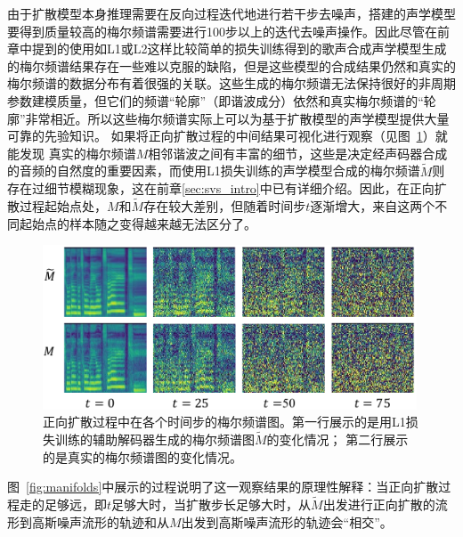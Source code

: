 由于扩散模型本身推理需要在反向过程迭代地进行若干步去噪声，搭建的声学模型要得到质量较高的梅尔频谱需要进行100步以上的迭代去噪声操作。因此尽管在前章中提到的使用如L1或L2这样比较简单的损失训练得到的歌声合成声学模型生成的梅尔频谱结果存在一些难以克服的缺陷，但是这些模型的合成结果仍然和真实的梅尔频谱的数据分布有着很强的关联。这些生成的梅尔频谱无法保持很好的非周期参数建模质量，但它们的频谱``轮廓''（即谐波成分）依然和真实梅尔频谱的``轮廓''非常相近。所以这些梅尔频谱实际上可以为基于扩散模型的声学模型提供大量可靠的先验知识。
如果将正向扩散过程的中间结果可视化进行观察（见图~\ref{fig:fake_real_mels_diffusion}）就能发现
真实的梅尔频谱$M$相邻谐波之间有丰富的细节，这些是决定经声码器合成的音频的自然度的重要因素，而使用L1损失训练的声学模型合成的梅尔频谱$\widetilde{M}$则存在过细节模糊现象，这在前章\ref{sec:svs_intro}中已有详细介绍。因此，在正向扩散过程起始点处，$M$和$\widetilde{M}$存在较大差别，但随着时间步$t$逐渐增大，来自这两个不同起始点的样本随之变得越来越无法区分了。
\begin{figure}[!h]
    \centering
    \includegraphics[width=0.99\textwidth,]{figure/svs/fake_real_mel.pdf}
    \caption{正向扩散过程中在各个时间步的梅尔频谱图。第一行展示的是用L1损失训练的辅助解码器生成的梅尔频谱图$\widetilde{M}$的变化情况； 第二行展示的是真实的梅尔频谱图的变化情况。}
    \label{fig:fake_real_mels_diffusion}
\end{figure}
图~\ref{fig:manifolds}中展示的过程说明了这一观察结果的原理性解释：当正向扩散过程走的足够远，即$t$足够大时，当扩散步长足够大时，从$\widetilde{M}$出发进行正向扩散的流形到高斯噪声流形的轨迹和从$M$出发到高斯噪声流形的轨迹会``相交''。
